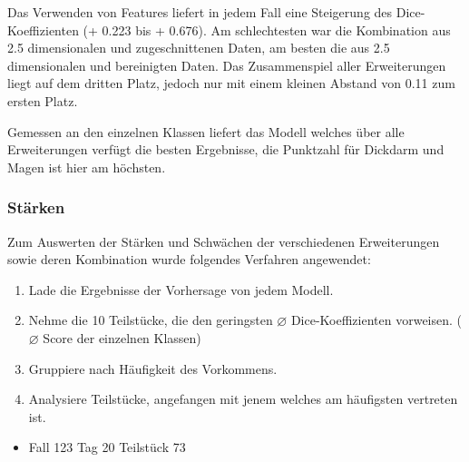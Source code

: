 Das Verwenden von Features liefert in jedem Fall eine Steigerung des Dice-Koeffizienten (+ 0.223 bis + 0.676). Am schlechtesten war die Kombination aus 2.5 dimensionalen und zugeschnittenen Daten, am besten die aus 2.5 dimensionalen und bereinigten Daten. Das Zusammenspiel aller Erweiterungen liegt auf dem dritten Platz, jedoch nur mit einem kleinen Abstand von 0.11 zum ersten Platz. 

Gemessen an den einzelnen Klassen liefert das Modell welches über alle Erweiterungen verfügt die besten Ergebnisse, die Punktzahl für Dickdarm und Magen ist hier am höchsten. 

\subsubsection{Stärken}

Zum Auswerten der Stärken und Schwächen der verschiedenen Erweiterungen sowie deren Kombination wurde folgendes Verfahren angewendet:

\begin{enumerate}
\item Lade die Ergebnisse der Vorhersage von jedem Modell.
\item Nehme die 10 Teilstücke, die den geringsten $
\varnothing
$ Dice-Koeffizienten vorweisen. ($\varnothing$ Score der einzelnen Klassen) 
\item  Gruppiere nach Häufigkeit des Vorkommens.
\item Analysiere Teilstücke, angefangen mit jenem welches am häufigsten vertreten ist.
\end{enumerate}

\begin{itemize}
\item Fall 123 Tag 20 Teilstück 73
\end{itemize}

\begin{table}[H]
\centering
{}
\caption{Siehe Abb. \ref{Fig:case123_day20_slice_0073}}
\end{table}

